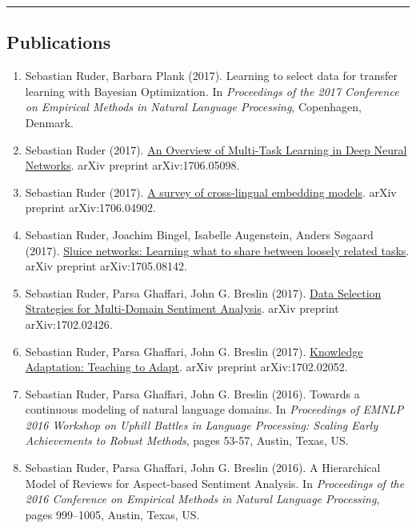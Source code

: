 \documentclass[10pt,letterpaper]{article}
\begin{document}
\hrule
\vspace{-0.4em}
\subsection*{Publications}

\begin{enumerate}
	\parskip=0.1em
	
	\item Sebastian Ruder, Barbara Plank (2017). Learning to select data for transfer learning with Bayesian Optimization. In \textit{Proceedings of the 2017 Conference on Empirical Methods in Natural Language Processing}, Copenhagen, Denmark.
	
	\item Sebastian Ruder (2017). \href{https://arxiv.org/abs/1706.05098}{An Overview of Multi-Task Learning in Deep Neural Networks}. arXiv preprint arXiv:1706.05098.

	\item Sebastian Ruder (2017). \href{https://arxiv.org/abs/1706.04902}{A survey of cross-lingual embedding models}. arXiv preprint arXiv:1706.04902.
	
	\item Sebastian Ruder, Joachim Bingel, Isabelle Augenstein, Anders Søgaard (2017). \href{https://arxiv.org/abs/1705.08142}{Sluice networks: Learning what to share between loosely related tasks}. arXiv preprint arXiv:1705.08142.
	
	\item Sebastian Ruder, Parsa Ghaffari, John G. Breslin (2017). \href{https://arxiv.org/abs/1702.02426}{Data Selection Strategies for Multi-Domain Sentiment Analysis}. arXiv preprint arXiv:1702.02426.
	
	\item Sebastian Ruder, Parsa Ghaffari, John G. Breslin (2017). \href{https://arxiv.org/abs/1702.02052}{Knowledge Adaptation: Teaching to Adapt}. arXiv preprint arXiv:1702.02052.
	
	\item Sebastian Ruder, Parsa Ghaffari, John G. Breslin (2016). Towards a continuous modeling of natural language domains. In \textit{Proceedings of EMNLP 2016 Workshop on Uphill Battles in Language Processing: Scaling Early Achievements to Robust Methods}, pages 53-57, Austin, Texas, US.
	
	\item Sebastian Ruder, Parsa Ghaffari, John G. Breslin (2016). A Hierarchical Model of Reviews for Aspect-based Sentiment Analysis. In \textit{Proceedings of the 2016 Conference on Empirical Methods in Natural Language Processing}, pages 999–1005, Austin, Texas, US.
	

\end{enumerate}
\end{document}

